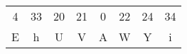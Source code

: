 \documentclass[preview,varwidth ,multi, 12pt]{standalone}
\begin{document}
\preview
\begin{tabular}{ c c c c c c c c }
4 & 33 & 20 & 21 & 0 & 22 & 24 & 34 \\
E & h & U & V & A & W & Y & i
\end{tabular}
\endpreview
\end{document}

